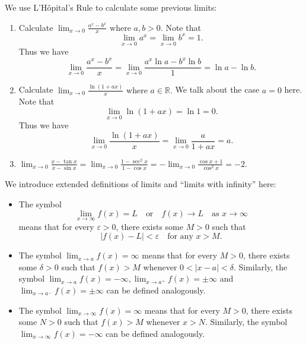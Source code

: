         \begin{exampleenv}
            We use L'Hôpital's Rule to calculate some previous limits:
            \begin{enumerate}[label=(\arabic*)]
                \item Calculate \(\displaystyle
            \lim_{x\to 0} \frac{a^x - b^x}{x}\text{ where } a,b>0.
            \) Note that
            \[
            \lim_{x\to 0} a^x = \lim_{x\to 0} b^x = 1.
            \]
            Thus we have
            \[
            \lim_{x\to 0} \frac{a^x - b^x}{x} = \lim_{x\to 0} \frac{a^x \ln a - b^x \ln b}{1} = \ln a - \ln b.
            \]
                \item Calculate \(\displaystyle
            \lim_{x\to 0} \frac{\ln(1+ax)}{x} \text{ where } a\in \mathbb{R}.
            \) We talk about the case $a=0$ here. Note that
            \[
            \lim_{x\to 0} \ln(1+ax) = \ln 1 = 0.
            \]
            Thus we have
            \[
            \lim_{x\to 0} \frac{\ln(1+ax)}{x} = \lim_{x\to 0} \frac{a}{1+ax} = a.
            \]
            \item $\displaystyle \lim_{x\to 0} \frac{x-\tan x}{x-\sin x} = \lim_{x\to 0}\frac{1-\sec^2 x}{1-\cos x} =-\lim_{x\to 0} \frac{\cos x+1}{\cos^2 x}= -2$.
            \end{enumerate}
        \end{exampleenv}
        \begin{definitionenv}
            We introduce extended definitions of limits and ``limits with infinity'' here:
            \begin{itemize}
                \item The symbol
                \[
                \lim_{x\to \infty} f(x) = L \quad \text{or} \quad f(x) \to L \quad \text{as } x\to \infty
                \]
                means that for every $\varepsilon > 0$, there exists some $M>0$ such that \[|f(x) - L| < \varepsilon \quad \text{for any } x > M. \]
                \item The symbol $\displaystyle \lim_{x\to a} f(x) = \infty$ means that for every $M>0$, there exists some $\delta > 0$ such that $f(x) > M$ whenever $0 < |x-a| < \delta$. Similarly, the symbol $\displaystyle \lim_{x\to a} f(x) = -\infty, \displaystyle \lim_{x\to a^+} f(x) = \pm \infty$ and $\displaystyle \lim_{x\to a^-} f(x) = \pm \infty$ can be defined analogously.
                \item The symbol $\displaystyle \lim_{x\to \infty} f(x) = \infty$ means that for every $M>0$, there exists some $N>0$ such that $f(x) > M$ whenever $x > N$. Similarly, the symbol $\displaystyle \lim_{x\to \infty} f(x) = -\infty$ can be defined analogously.
            \end{itemize}
        \end{definitionenv}
